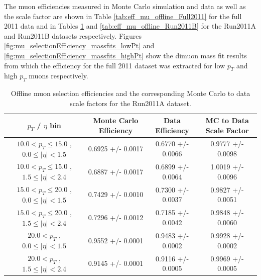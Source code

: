 \label{app:efficiency_studies_muon}

The muon efficiencies measured in Monte Carlo simulation and data as well as the scale 
factor are shown in Table \ref{tab:eff_mu_offline_Full2011} for the full 2011 data and in Tables 
\ref{tab:eff_mu_offline_Run2011A} and \ref{tab:eff_mu_offline_Run2011B} for 
the Run2011A and Run2011B datasets respectively. Figures \ref{fig:mu_selectionEfficiency_massfits_lowPt}
and \ref{fig:mu_selectionEfficiency_massfits_highPt} show the dimuon mass fit 
results from which the efficiency for the full 2011 dataset was extracted for
low $p_{T}$ and high $p_{T}$ muons respectively.



 \begin{table}[!ht]
 \begin{center} 
 \begin{tabular}{|c|c|c|c|}
 \hline
 $p_{T}$ / $\eta$ bin    &  Monte Carlo Efficiency    &  Data Efficiency   &  MC to Data Scale Factor \\   \hline           
$ 10.0 < p_{T} \le  15.0$ , $  0.0  \le |\eta| <   1.5$   &       0.6925 +/- 0.0017   &       0.6770 +/- 0.0066   &       0.9777 +/- 0.0098   \\   
\hline
$ 10.0 < p_{T} \le  15.0$ , $  1.5  \le |\eta| <   2.4$   &       0.6887 +/- 0.0017   &       0.6899 +/- 0.0064   &       1.0019 +/- 0.0096   \\   
\hline
$ 15.0 < p_{T} \le  20.0$ , $  0.0  \le |\eta| <   1.5$   &       0.7429 +/- 0.0010   &       0.7300 +/- 0.0037   &       0.9827 +/- 0.0051   \\   
\hline
$ 15.0 < p_{T} \le  20.0$ , $  1.5  \le |\eta| <   2.4$   &       0.7296 +/- 0.0012   &       0.7185 +/- 0.0042   &       0.9848 +/- 0.0060   \\   
\hline
$ 20.0 < p_{T} $ , $  0.0  \le |\eta| <   1.5$   &       0.9552 +/- 0.0001   &       0.9483 +/- 0.0002   &       0.9928 +/- 0.0002   \\   
\hline
$ 20.0 < p_{T} $ , $  1.5  \le |\eta| <   2.4$   &       0.9145 +/- 0.0001   &       0.9116 +/- 0.0005   &       0.9969 +/- 0.0005   \\   
\hline
\end{tabular}
\caption{Offline muon selection efficiencies and the corresponding Monte Carlo to data scale factors for the
Run2011A dataset.}
\label{tab:eff_mu_offline_Run2011A}
\end{center}
\end{table}


